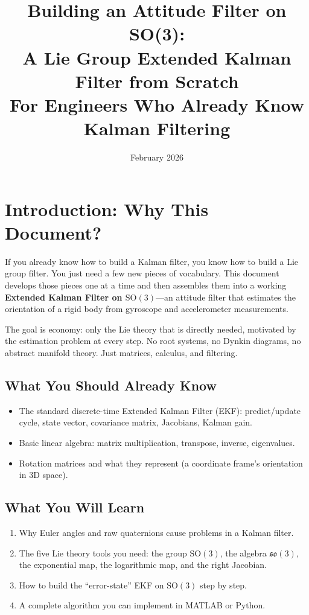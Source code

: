 \documentclass[11pt,letterpaper]{article}
\title{\textbf{Building an Attitude Filter on SO(3):\\
A Lie Group Extended Kalman Filter from Scratch}\\[8pt]
\large For Engineers Who Already Know Kalman Filtering}
\author{}
\date{February 2026}
\newcommand{\SO}{\mathrm{SO}(3)}
\newcommand{\so}{\mathfrak{so}(3)}
\begin{document}
\maketitle
\thispagestyle{fancy}

\tableofcontents
\newpage

\section{Introduction: Why This Document?}

If you already know how to build a Kalman filter, you know how to
build a Lie group filter.  You just need a few new pieces of
vocabulary.  This document develops those pieces one at a time and
then assembles them into a working \textbf{Extended Kalman Filter
on $\SO$}---an attitude filter that estimates the orientation of a
rigid body from gyroscope and accelerometer measurements.

The goal is economy: only the Lie theory that is directly needed,
motivated by the estimation problem at every step.  No root systems,
no Dynkin diagrams, no abstract manifold theory.  Just matrices,
calculus, and filtering.

\subsection*{What You Should Already Know}

\begin{itemize}[nosep]
  \item The standard discrete-time Extended Kalman Filter (EKF):
    predict/update cycle, state vector, covariance matrix,
    Jacobians, Kalman gain.
  \item Basic linear algebra: matrix multiplication, transpose,
    inverse, eigenvalues.
  \item Rotation matrices and what they represent (a coordinate
    frame's orientation in 3D space).
\end{itemize}

\subsection*{What You Will Learn}

\begin{enumerate}[nosep]
  \item Why Euler angles and raw quaternions cause problems in a
    Kalman filter.
  \item The five Lie theory tools you need: the group $\SO$, the
    algebra $\so$, the exponential map, the logarithmic map, and
    the right Jacobian.
  \item How to build the ``error-state'' EKF on $\SO$ step by step.
  \item A complete algorithm you can implement in MATLAB or Python.
\end{enumerate}
\end{document}
